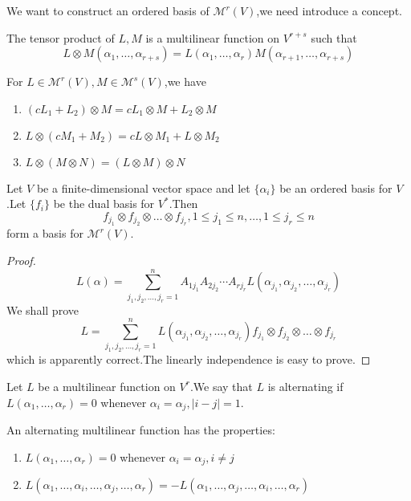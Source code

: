 \documentclass{article}
\begin{document}
We want to construct an ordered basis of $\mathcal{M}^r(V)$,we need introduce a concept.
\begin{dde}
	The tensor product of $L,M$ is a multilinear function on $V^{r+s}$ such that
	\[L\otimes M(\alpha_1,\dots,\alpha_{r+s})=L(\alpha_1,\dots,\alpha_r)M(\alpha_{r+1},\dots,\alpha_{r+s})\]
\end{dde}
\begin{thm}
	For $L\in\mathcal{M}^r(V),M\in\mathcal{M}^s(V)$,we have
	\begin{enumerate}
		\item $(cL_1+L_2)\otimes M=cL_1\otimes M+L_2\otimes M$
		\item $L\otimes(cM_1+M_2)=cL\otimes M_1+L\otimes M_2$
		\item $L\otimes(M\otimes N)=(L\otimes M)\otimes N$
	\end{enumerate}
\end{thm}
\begin{thm}
	Let $V$ be a finite-dimensional vector space and let $\{\alpha_i\}$ be an ordered basis for $V$.Let $\{f_i\}$ be the dual basis for $V^*$.Then
	\[f_{j_1}\otimes f_{j_2}\otimes\dots\otimes f_{j_r},1\le j_1\le n,\dots,1\le j_r\le n\]
	form a basis for $\mathcal{M}^r(V)$.
\end{thm}
\begin{proof}
	\[L(\alpha)=\sum\limits_{j_1,j_2,\dots,j_r=1}^nA_{1j_1}A_{2j_2}\cdots A_{rj_r}L(\alpha_{j_1},\alpha_{j_2},\dots,\alpha_{j_r})\]
	We shall prove
	\[L=\sum\limits_{j_1,j_2,\dots,j_r=1}^nL(\alpha_{j_1},\alpha_{j_2},\dots,\alpha_{j_r})f_{j_1}\otimes f_{j_2}\otimes\dots\otimes f_{j_r}\]
	which is apparently correct.The linearly independence is easy to prove.
\end{proof}
\begin{dde}
	Let $L$ be a multilinear function on $V^r$.We say that $L$ is alternating if $L(\alpha_1,\dots,\alpha_r)=0$ whenever $\alpha_i=\alpha_j,|i-j|=1$.
\end{dde}
\begin{thm}
	An alternating multilinear function has the properties:
	\begin{enumerate}
		\item $L(\alpha_1,\dots,\alpha_r)=0$ whenever $\alpha_i=\alpha_j,i\neq j$
		\item $L(\alpha_1,\dots,\alpha_i,\dots,\alpha_j,\dots,\alpha_r)=-L(\alpha_1,\dots,\alpha_j,\dots,\alpha_i,\dots,\alpha_r)$
	\end{enumerate}
\end{thm}
\end{document}

